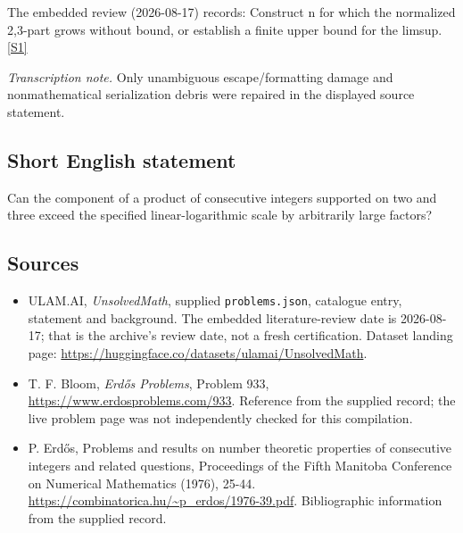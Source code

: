 \documentclass[11pt,a4paper]{article}
\newcommand{\sref}[2]{\hyperlink{source:#1:#2}{[S#2]}}
\begin{document}
The embedded review (2026-08-17) records: Construct n for which the normalized 2,3-part grows without bound, or establish a finite upper bound for the limsup. \sref{statement}{1}

{\small\emph{Transcription note.} Only unambiguous escape/formatting damage and nonmathematical serialization debris were repaired in the displayed source statement.}

\subsection{Short English statement}

Can the component of a product of consecutive integers supported on two and three exceed the specified linear-logarithmic scale by arbitrarily large factors?

\subsection{Sources}

{\small

\begin{itemize}

\item[\hypertarget{source:statement:1}{S1}] ULAM.AI, \emph{UnsolvedMath}, supplied \texttt{problems.json}, catalogue entry, statement and background. The embedded literature-review date is 2026-08-17; that is the archive’s review date, not a fresh certification. Dataset landing page: \url{https://huggingface.co/datasets/ulamai/UnsolvedMath}.

\item[\hypertarget{source:statement:2}{S2}] T. F. Bloom, \emph{Erdős Problems}, Problem 933, \url{https://www.erdosproblems.com/933}. Reference from the supplied record; the live problem page was not independently checked for this compilation.

\item[\hypertarget{source:statement:3}{S3}] P. Erdős, Problems and results on number theoretic properties of consecutive integers and related questions, Proceedings of the Fifth Manitoba Conference on Numerical Mathematics (1976), 25-44. \url{https://combinatorica.hu/~p_erdos/1976-39.pdf}. Bibliographic information from the supplied record.

\end{itemize}

}

\label{end:statement}
\end{document}
